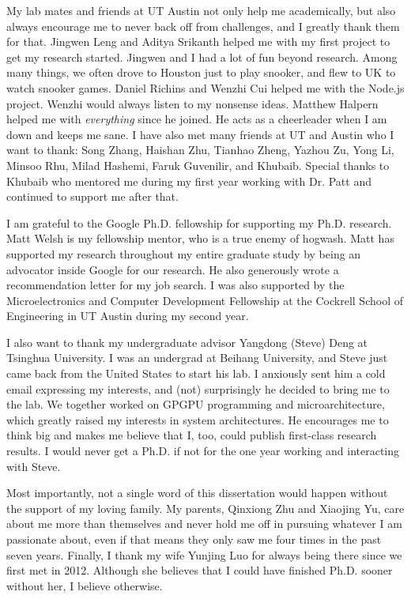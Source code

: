 \begin{acknowledgments}
My lab mates and friends at UT Austin not only help me academically, but also always encourage me to never back off from challenges, and I greatly thank them for that. Jingwen Leng and Aditya Srikanth helped me with my first project to get my research started. Jingwen and I had a lot of fun beyond research. Among many things, we often drove to Houston just to play snooker, and flew to UK to watch snooker games. Daniel Richins and Wenzhi Cui helped me with the Node.js project. Wenzhi would always listen to my nonsense ideas. Matthew Halpern helped me with \textit{everything} since he joined. He acts as a cheerleader when I am down and keeps me sane. I have also met many friends at UT and Austin who I want to thank: Song Zhang, Haishan Zhu, Tianhao Zheng, Yazhou Zu, Yong Li, Minsoo Rhu, Milad Hashemi, Faruk Guvenilir, and Khubaib. Special thanks to Khubaib who mentored me during my first year working with Dr. Patt and continued to support me after that.

I am grateful to the Google Ph.D. fellowship for supporting my Ph.D. research. Matt Welsh is my fellowship mentor, who is a true enemy of hogwash. Matt has supported my research throughout my entire graduate study by being an advocator inside Google for our research. He also generously wrote a recommendation letter for my job search. I was also supported by the Microelectronics and Computer Development Fellowship at the Cockrell School of Engineering in UT Austin during my second year.

I also want to thank my undergraduate advisor Yangdong (Steve) Deng at Tsinghua University. I was an undergrad at Beihang University, and Steve just came back from the United States to start his lab. I anxiously sent him a cold email expressing my interests, and (not) surprisingly he decided to bring me to the lab. We together worked on GPGPU programming and microarchitecture, which greatly raised my interests in system architectures. He encourages me to think big and makes me believe that I, too, could publish first-class research results. I would never get a Ph.D. if not for the one year working and interacting with Steve.

Most importantly, not a single word of this dissertation would happen without the support of my loving family. My parents, Qinxiong Zhu and Xiaojing Yu, care about me more than themselves and never hold me off in pursuing whatever I am passionate about, even if that means they only saw me four times in the past seven years. Finally, I thank my wife Yunjing Luo for always being there since we first met in 2012. Although she believes that I could have finished Ph.D. sooner without her, I believe otherwise.


\end{acknowledgments}
